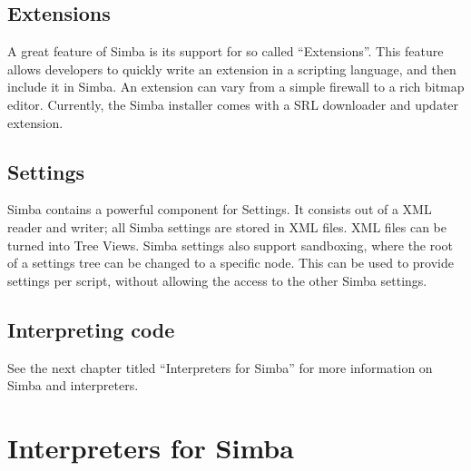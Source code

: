 \documentclass[a4paper, 10pt]{report} %
\begin{document}
\section{Extensions}

A great feature of Simba is its support for so called ``Extensions''.
This feature allows developers to quickly write an extension in a scripting
language, and then include it in Simba. An extension can vary from a simple
firewall to a rich bitmap editor. Currently, the Simba installer comes with a
SRL downloader and updater extension.

\section{Settings}

Simba contains a powerful component for Settings. It consists out of a XML
reader and writer; all Simba settings are stored in XML files. XML files can be
turned into Tree Views. Simba settings also support sandboxing, where the root
of a settings tree can be changed to a specific node. This can be used to
provide settings per script, without allowing the access to the other Simba
settings.

\section{Interpreting code}

See the next chapter titled ``Interpreters for Simba'' for more
information on Simba and interpreters.



\chapter{Interpreters for Simba}
\end{document}
